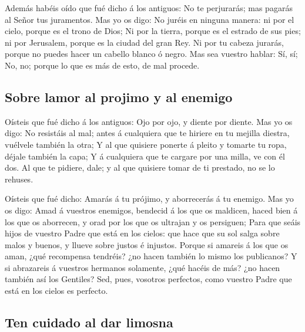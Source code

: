  Además habéis oído que fué dicho á los antiguos: No te
perjurarás; mas pagarás al Señor tus juramentos.  Mas yo
os digo: No juréis en ninguna manera: ni por el cielo, porque es el
trono de Dios;  Ni por la tierra, porque es el estrado de
sus pies; ni por Jerusalem, porque es la ciudad del gran Rey.
 Ni por tu cabeza jurarás, porque no puedes hacer un
cabello blanco ó negro.  Mas sea vuestro hablar: Sí, sí;
No, no; porque lo que es más de esto, de mal procede.

\hypertarget{sobre-lamor-al-projimo-y-al-enemigo}{%
\subsection{Sobre l\textquotesingle amor al projimo y al
enemigo}\label{sobre-lamor-al-projimo-y-al-enemigo}}

 Oísteis que fué dicho á los antiguos: Ojo por ojo, y
diente por diente.  Mas yo os digo: No resistáis al mal;
antes á cualquiera que te hiriere en tu mejilla diestra, vuélvele
también la otra;  Y al que quisiere ponerte á pleito y
tomarte tu ropa, déjale también la capa;  Y á cualquiera
que te cargare por una milla, ve con él dos.  Al que te
pidiere, dale; y al que quisiere tomar de ti prestado, no se lo rehuses.

 Oísteis que fué dicho: Amarás á tu prójimo, y
aborrecerás á tu enemigo.  Mas yo os digo: Amad á
vuestros enemigos, bendecid á los que os maldicen, haced bien á los que
os aborrecen, y orad por los que os ultrajan y os persiguen;
 Para que seáis hijos de vuestro Padre que está en los
cielos: que hace que su sol salga sobre malos y buenos, y llueve sobre
justos é injustos.  Porque si amareis á los que os aman,
¿qué recompensa tendréis? ¿no hacen también lo mismo los publicanos?
 Y si abrazareis á vuestros hermanos solamente, ¿qué
hacéis de más? ¿no hacen también así los Gentiles?  Sed,
pues, vosotros perfectos, como vuestro Padre que está en los cielos es
perfecto.

\hypertarget{ten-cuidado-al-dar-limosna}{%
\subsection{Ten cuidado al dar
limosna}\label{ten-cuidado-al-dar-limosna}}

